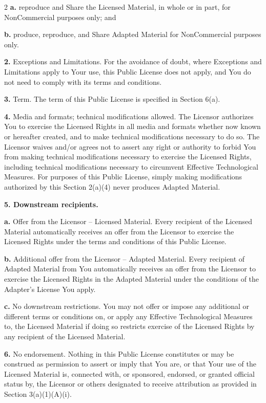 \begin{multicols*}{2}
    \textbf{a.} reproduce and Share the Licensed Material, in whole or in part,
    for NonCommercial purposes only; and

    \textbf{b.} produce, reproduce, and Share Adapted Material for
    NonCommercial purposes only.

    \textbf{2.} Exceptions and Limitations. For the avoidance of doubt, where
    Exceptions and Limitations apply to Your use, this Public License does
    not apply, and You do not need to comply with its terms and conditions.

    \textbf{3.} Term. The term of this Public License is specified in Section 6(a).

    \textbf{4.} Media and formats; technical modifications allowed. The Licensor
    authorizes You to exercise the Licensed Rights in all media and formats
    whether now known or hereafter created, and to make technical
    modifications necessary to do so. The Licensor waives and/or agrees not
    to assert any right or authority to forbid You from making technical
    modifications necessary to exercise the Licensed Rights, including
    technical modifications necessary to circumvent Effective Technological
    Measures. For purposes of this Public License, simply making
    modifications authorized by this Section 2(a)(4) never produces
    Adapted Material.

    \textbf{5. Downstream recipients.}

    \textbf{a.} Offer from the Licensor -- Licensed Material. Every recipient of
    the Licensed Material automatically receives an offer from the Licensor
    to exercise the Licensed Rights under the terms and conditions of this
    Public License.

    \textbf{b.} Additional offer from the Licensor -- Adapted Material. Every
    recipient of Adapted Material from You automatically receives an offer
    from the Licensor to exercise the Licensed Rights in the Adapted
    Material under the conditions of the Adapter's License You apply.

    \textbf{c.} No downstream restrictions. You may not offer or impose any
    additional or different terms or conditions on, or apply any Effective
    Technological Measures to, the Licensed Material if doing so restricts
    exercise of the Licensed Rights by any recipient of the Licensed
    Material.

    \textbf{6.} No endorsement. Nothing in this Public License constitutes or may
    be construed as permission to assert or imply that You are, or that
    Your use of the Licensed Material is, connected with, or sponsored,
    endorsed, or granted official status by, the Licensor or others
    designated to receive attribution as provided in Section 3(a)(1)(A)(i).


\end{multicols*}
